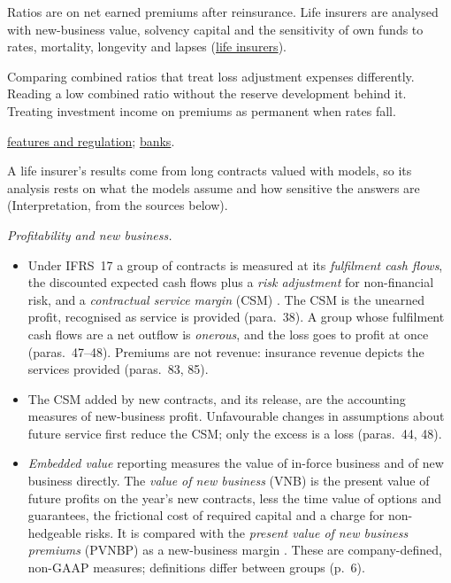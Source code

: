 \begin{qfmethod}
 Ratios are on net earned premiums after reinsurance. Life insurers are analysed with new-business value, solvency capital and the sensitivity of own funds to rates, mortality, longevity and lapses (\hyperref[meth:life-insurer-analysis]{life insurers}).

 Comparing combined ratios that treat loss adjustment expenses differently. Reading a low combined ratio without the reserve development behind it. Treating investment income on premiums as permanent when rates fall.

 \hyperref[def:financial-institution-features]{features and regulation}; \hyperref[meth:bank-camels-analysis]{banks}.

\end{qfmethod}

\begin{qfmethod}\label{meth:life-insurer-analysis}
 A life insurer's results come from long contracts valued with models, so its analysis rests on what the models assume and how sensitive the answers are (Interpretation, from the sources below).

\emph{Profitability and new business.}
\begin{itemize}
\item Under IFRS~17 a group of contracts is measured at its \emph{fulfilment cash flows}, the discounted expected cash flows plus a \emph{risk adjustment} for non-financial risk, and a \emph{contractual service margin} (CSM) \citep[IFRS~17 paras.~32, 37]{eu-2023-1803-ifrs17}. The CSM is the unearned profit, recognised as service is provided (para.~38). A group whose fulfilment cash flows are a net outflow is \emph{onerous}, and the loss goes to profit at once (paras.~47--48). Premiums are not revenue: insurance revenue depicts the services provided (paras.~83, 85).
\item The CSM added by new contracts, and its release, are the accounting measures of new-business profit. Unfavourable changes in assumptions about future service first reduce the CSM; only the excess is a loss (paras.~44, 48).
\item \emph{Embedded value} reporting measures the value of in-force business and of new business directly. The \emph{value of new business} (VNB) is the present value of future profits on the year's new contracts, less the time value of options and guarantees, the frictional cost of required capital and a charge for non-hedgeable risks. It is compared with the \emph{present value of new business premiums} (PVNBP) as a new-business margin \citep[pp.~6, 12]{cnp-mcev-2017}. These are company-defined, non-GAAP measures; definitions differ between groups (p.~6).
\end{itemize}


\end{qfmethod}
